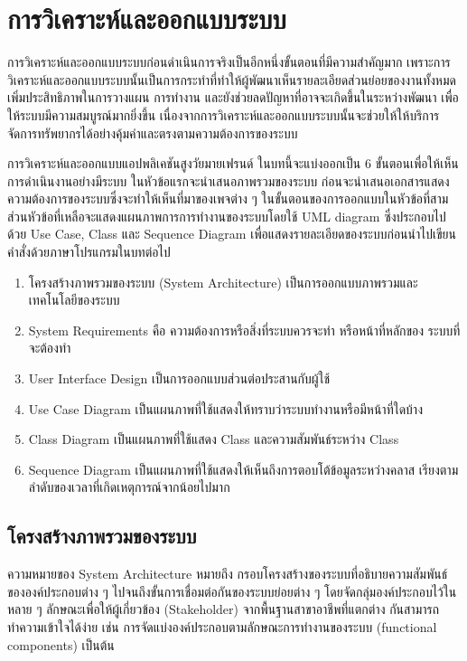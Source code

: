 \chapter{การวิเคราะห์และออกแบบระบบ}

การวิเคราะห์และออกแบบระบบก่อนดำเนินการจริงเป็นอีกหนึ่งขั้นตอนที่มีความสำคัญมาก เพราะการวิเคราะห์และออกแบบระบบนั้นเป็นการกระทำที่ทำให้ผู้พัฒนาเห็นรายละเอียดส่วนย่อยของงานทั้งหมด เพิ่มประสิทธิภาพในการวางแผน การทำงาน และยังช่วยลดปัญหาที่อาจจะเกิดขึ้นในระหว่างพัฒนา เพื่อให้ระบบมีความสมบูรณ์มากยิ่งขึ้น เนื่องจากการวิเคราะห์และออกแบบระบบนั้นจะช่วยให้ให้บริการ จัดการทรัพยากรได้อย่างคุ้มค่าและตรงตามความต้องการของระบบ

การวิเคราะห์และออกแบบแอปพลิเคชันสูงวัยมายเฟรนด์ ในบทนี้จะแบ่งออกเป็น 6 ขั้นตอนเพื่อให้เห็นการดำเนินงานอย่างมีระบบ ในหัวข้อแรกจะนำเสนอภาพรวมของระบบ ก่อนจะนำเสนอเอกสารแสดงความต้องการของระบบซึ่งจะทำให้เห็นที่มาของเพจต่าง ๆ ในขั้นตอนของการออกแบบในหัวข้อที่สาม ส่วนหัวข้อที่เหลือจะแสดงแผนภาพการการทำงานของระบบโดยใช้ UML diagram ซึ่งประกอบไปด้วย Use Case, Class และ Sequence Diagram เพื่อแสดงรายละเอียดของระบบก่อนนำไปเขียนคำสั่งด้วยภาษาโปรแกรมในบทต่อไป

\begin{enumerate}[label=3.\arabic*]
	\item โครงสร้างภาพรวมของระบบ (System Architecture) เป็นการออกแบบภาพรวมและเทคโนโลยีของระบบ
	\item System Requirements คือ ความต้องการหรือสิ่งที่ระบบควรจะทำ หรือหน้าที่หลักของ
	ระบบที่จะต้องทำ
	\item User Interface Design เป็นการออกแบบส่วนต่อประสานกับผู้ใช้
	\item Use Case Diagram เป็นแผนภาพที่ใช้แสดงให้ทราบว่าระบบทำงานหรือมีหน้าที่ใดบ้าง
	\item Class Diagram เป็นแผนภาพที่ใช้แสดง Class และความสัมพันธ์ระหว่าง Class
	\item Sequence Diagram เป็นแผนภาพที่ใช้แสดงให้เห็นถึงการตอบโต้ข้อมูลระหว่างคลาส เรียงตามลำดับของเวลาที่เกิดเหตุการณ์จากน้อยไปมาก
\end{enumerate}	

\section{โครงสร้างภาพรวมของระบบ}
    ความหมายของ System Architecture \cite{architecture} หมายถึง กรอบโครงสร้างของระบบที่อธิบายความสัมพันธ์ขององค์ประกอบต่าง ๆ ไปจนถึงขั้นการเชื่อมต่อกันของระบบย่อยต่าง ๆ โดยจัดกลุ่มองค์ประกอบไว้ในหลาย ๆ ลักษณะเพื่อให้ผู้เกี่ยวข้อง (Stakeholder) จากพื้นฐานสาขาอาชีพที่แตกต่าง กันสามารถทำความเข้าใจได้ง่าย เช่น การจัดแบ่งองค์ประกอบตามลักษณะการทำงานของระบบ (functional components) เป็นต้น
    
